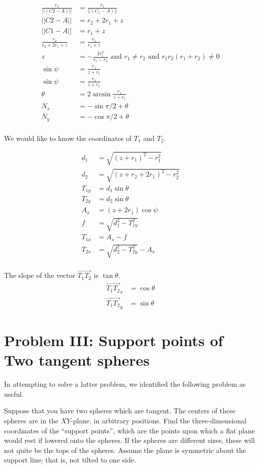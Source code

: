 \documentclass{article}
\begin{document}
\begin{align}
\frac{r_2}{||(C2 - A)||} &= \frac{r_1}{||(C_1-A)||} \\
||C2 - A|| &= r_2+2r_1+z \\
||C1 - A|| &= r_1 + z \\
\frac{r_2}{r_2+2r_1+z} &= \frac{r_1}{r_1+z} \\
z &= -\frac{2 r_1^2}{r_1 - r_2} \text{ and } r_1 \neq r_2 \text{ and } r_1 r_2 (r_1 + r_2) \neq 0 \\
\sin{\psi} &= \frac{r_1}{z + r_1} \\
\sin{\psi} &= \frac{r_1}{z + r_1} \\
\theta &=2 \arcsin{\frac{r_1}{z+r_1}} \\
N_x &= -\sin{\pi/2 + \theta} \\
N_y &= -\cos{\pi/2 + \theta} \\
\end{align}

We would like to know the coordinates of $T_1$ and $T_2$.

\begin{align}
  d_1 &= \sqrt{(z+r_1)^2 - r_1^2} \\
  d_2 &= \sqrt{(z+r_2+2r_1)^2 - r_2^2} \\
  T_{1y} &= d_1\sin{\theta} \\
  T_{2y} &= d_2\sin{\theta} \\
  A_x &= (z + 2r_1)\cos{\psi} \\
  f  &= \sqrt{d_1^2 - T_{1y}^2} \\
  T_{1x} &= A_x - f \\
  T_{2x} &=  \sqrt{d_2^2 - T_{2y}^2} - A_x \\
\end{align}


The slope of the vector $\overrightarrow{T_1T_2}$ is $\tan{\theta}$.
  \begin{align}
    \overrightarrow{T_1T_2}_x &= \cos{\theta} \\
    \overrightarrow{T_1T_2}_y &= \sin{\theta}
    \end{align}

  \section{Problem III: Support points of Two tangent spheres }

  In attempting to solve a latter problem, we identified the following problem as useful.

  Suppose that you have two spheres which are tangent. The centers of these spheres are
  in the $XY$-plane, in arbitrary positions.   Find the three-dimensional coordinates
  of the ``support points'', which are the points upon which a flat plane would rest
  if lowered onto the spheres. If the spheres are different sizes, these will not quite
  be the tops of the spheres.  Assume the plane is symmetric about the support line; that
  is, not tilted to one side.
\end{document}
